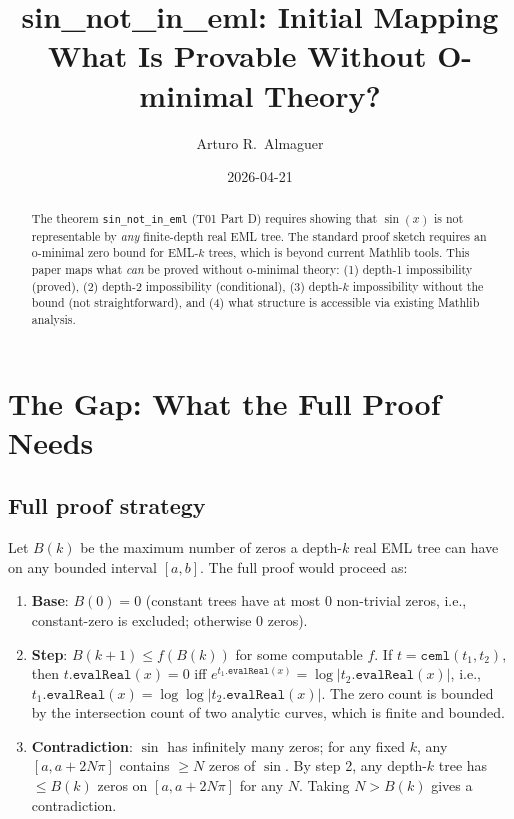 \documentclass[12pt]{article}
\title{\textbf{sin\_not\_in\_eml: Initial Mapping}\\[0.4em]
\large What Is Provable Without O-minimal Theory?}
\author{Arturo R.\ Almaguer}
\date{2026-04-21}
\theoremstyle{definition}
\begin{document}
\maketitle

\begin{abstract}
The theorem \texttt{sin\_not\_in\_eml} (T01 Part D) requires showing that $\sin(x)$
is not representable by \emph{any} finite-depth real EML tree.
The standard proof sketch requires an o-minimal zero bound for EML-$k$ trees,
which is beyond current Mathlib tools.
This paper maps what \emph{can} be proved without o-minimal theory:
(1) depth-1 impossibility (proved), (2) depth-2 impossibility (conditional),
(3) depth-$k$ impossibility without the bound (not straightforward),
and (4) what structure is accessible via existing Mathlib analysis.
\end{abstract}

\section{The Gap: What the Full Proof Needs}

\subsection{Full proof strategy}

Let $B(k)$ be the maximum number of zeros a depth-$k$ real EML tree can have on any
bounded interval $[a,b]$. The full proof would proceed as:

\begin{enumerate}
  \item \textbf{Base}: $B(0) = 0$ (constant trees have at most 0 non-trivial zeros,
        i.e., constant-zero is excluded; otherwise 0 zeros).
  \item \textbf{Step}: $B(k+1) \leq f(B(k))$ for some computable $f$.
        If $t = \texttt{ceml}(t_1, t_2)$, then $t.\texttt{evalReal}(x) = 0$
        iff $e^{t_1.\texttt{evalReal}(x)} = \log|t_2.\texttt{evalReal}(x)|$,
        i.e., $t_1.\texttt{evalReal}(x) = \log\log|t_2.\texttt{evalReal}(x)|$.
        The zero count is bounded by the intersection count of two analytic curves,
        which is finite and bounded.
  \item \textbf{Contradiction}: $\sin$ has infinitely many zeros; for any fixed $k$,
        any $[a, a+2N\pi]$ contains $\geq N$ zeros of $\sin$.
        By step 2, any depth-$k$ tree has $\leq B(k)$ zeros on $[a, a+2N\pi]$ for any $N$.
        Taking $N > B(k)$ gives a contradiction.
\end{enumerate}
\end{document}

